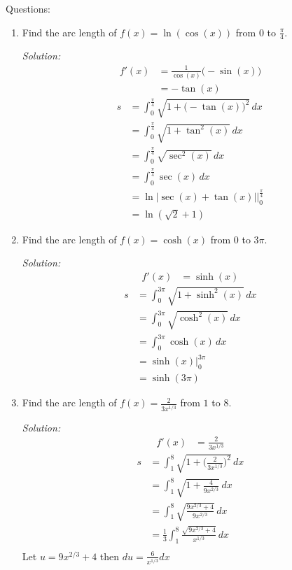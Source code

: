 \documentclass[16pt]{article}
\theoremstyle{remark}
\begin{document}
Questions:
\begin{enumerate}
\item Find the arc length of $f(x) = \ln(\cos(x))$ from $0$ to $\displaystyle{\frac{\pi}{4}}$.
\begin{mdframed}[style=TheoremFrame]
\textit{Solution:}
\begin{align*}
f'(x) &= \frac{1}{\cos(x)} \big(-\sin(x)\big)\\
&= -\tan(x)
\end{align*}
\begin{align*}
s&= \int_0^{\frac{\pi}{4}} \sqrt{1+\big(-\tan(x)\big)^2}\,dx\\
&= \int_0^{\frac{\pi}{4}} \sqrt{1+\tan^2(x)}\, dx\\
&= \int_0^{\frac{\pi}{4}} \sqrt{\sec^2(x)}\, dx\\
&= \int_0^{\frac{\pi}{4}} \sec(x) \, dx\\
&= \ln|\sec(x)+\tan(x)| \bigg|_0^{\frac{\pi}{4}}\\
&= \ln(\sqrt{2}+1)
\end{align*}
\end{mdframed}
\item Find the arc length of $f(x) = \cosh(x)$ from $0$ to $3\pi$.
\begin{mdframed}[style=TheoremFrame]
\textit{Solution:}
\begin{align*}
f'(x) &= \sinh(x)
\end{align*}
\begin{align*}
s &= \int_0^{3\pi} \sqrt{1+\sinh^2(x)}\, dx\\
&= \int_0^{3\pi} \sqrt{\cosh^2(x)}\, dx\\
&=\int_0^{3\pi} \cosh(x)\, dx\\
&=\sinh(x) \bigg|_0^{3\pi}\\
&= \sinh(3\pi)
\end{align*}
\end{mdframed}
\newpage
\item Find the arc length of $\displaystyle{f(x) = \frac{2}{3x^{1/3}}}$ from $1$ to $8$.
\begin{mdframed}[style=TheoremFrame]
\textit{Solution:}
\begin{align*}
f'(x) &= \frac{2}{3x^{1/3}}
\end{align*}
\begin{align*}
s&= \int_1^8 \sqrt{1+\bigg(\frac{2}{3x^{1/3}}\bigg)^2}\, dx\\
&= \int_1^8 \sqrt{1+\frac{4}{9x^{2/3}}}\, dx\\
&= \int_1^8 \sqrt{\frac{9x^{2/3}+4}{9x^{2/3}}}\, dx\\
&= \frac{1}{3}\int_1^8 \frac{\sqrt{9x^{2/3}+4}}{x^{1/3}}\, dx\\
\end{align*}
Let $\displaystyle{u=9x^{2/3}+4}$ then $\displaystyle{du =\frac{6}{x^{1/3}} dx}$\\


\end{mdframed}
\end{enumerate}
\end{document}
